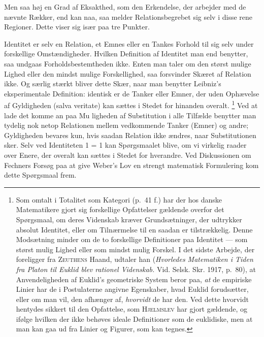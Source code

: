 \documentclass[12pt]{article}
\newcommand{\opage}[1]{\marginnote{\footnotesize\textit{[#1]}}}
\begin{document}
Men saa høj en Grad af Eksakthed, som den Erkendelse, der arbejder med
de nævnte Rækker, end kan naa, saa melder Relationsbegrebet sig selv i
disse rene Regioner. Dette viser sig især paa tre Punkter.

Identitet er selv en Relation, et Emnes eller en Tankes Forhold til sig
selv under forskellige Omstændigheder. Hvilken Definition af Identitet
man end benytter, saa undgaas Forholdsbestemtheden ikke. Enten man taler
om den størst mulige Lighed eller den mindst mulige Forskellighed, saa
forsvinder Skæret af Relation ikke. Og særlig stærkt bliver dette Skær,
naar man benytter Leibniz's eksperimentale Definition: identisk er de
Tanker eller Emner, der uden Ophævelse af Gyldigheden (salva veritate)
kan sættes i Stedet for hinanden overalt.%
\footnote{Som omtalt i \guillemotright Totalitet som
Kategori\guillemotleft{} (p.~41 f.) har der hos danske Matematikere
gjort sig forskellige Opfattelser gældende overfor det Spørgsmaal, om
deres Videnskab kræver Grundsætninger, der udtrykker absolut Identitet,
eller om Tilnærmelse til en saadan er tilstrækkelig. Denne Modsætning
minder om de to forskellige Definitioner paa Identitet --- som størst
mulig Lighed eller som mindst mulig Forskel. I det sidste Arbejde, der
foreligger fra \textsc{Zeuthens} Haand, udtaler han
(\textit{Hvorledes Matematiken i Tiden fra Platon til Euklid blev
rationel Videnskab.} Vid. Selsk. Skr. 1917, p.~80), at Anvendeligheden af
Euklid's geometriske System beror paa, \emph{at} de empiriske Linier har
de i Postulaterne angivne Egenskaber, hvad Euklid forudsætter, eller om
man vil, den afhænger af, \emph{hvorvidt} de har den. Ved dette
\guillemotright hvorvidt\guillemotleft{} hentydes sikkert til den
Opfattelse, som \textsc{Hjelmslev} har gjort gældende, og ifølge hvilken
der ikke behøves ideale Definitioner som de euklidiske, men at man kan
gaa ud fra Linier og Figurer, som kan tegnes.} Ved at lade det komme an
paa Mu%
\opage{41}%
ligheden af Substitution i alle Tilfælde benytter man tydelig nok netop
Relationen mellem vedkommende Tanker (Emner) og andre; Gyldigheden
bevares kun, hvis saadan Relation ikke ændres, naar Substitutionen sker.
Selv ved Identiteten 1 = 1 kan Spørgsmaalet blive, om vi virkelig raader
over Enere, der overalt kan sættes i Stedet for hverandre. Ved
Diskussionen om Fechners Forsøg paa at give Weber's Lov en strengt
matematisk Formulering kom dette Spørgsmaal frem.
\end{document}
